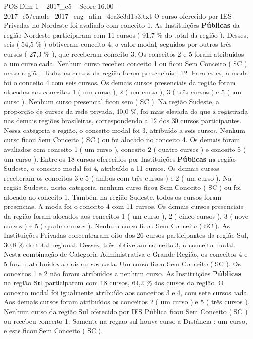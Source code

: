 \begin{textsample}{POS Dim 1 – 2017\_c5 – Score 16.00 – 2017\_c5/enade\_2017\_eng\_alim\_4ea3c3d1b3.txt}
O curso oferecido por IES Privadas no Nordeste foi avaliado com conceito 1.
As Instituições \textbf{Públicas} da região Nordeste participaram com 11 cursos ( 91,7 \% do total da região ).
Desses, seis ( 54,5 \% ) obtiveram conceito 4, o valor modal, seguidos por outros três cursos ( 27,3 \% ), que receberam conceito 3.
Os conceitos 2 e 5 foram atribuídos a um curso cada.
Nenhum curso recebeu conceito 1 ou ficou Sem Conceito ( SC ) nessa região.
Todos os cursos da região foram presenciais : 12.
Para estes, a moda foi o conceito 4 com seis cursos.
Os demais cursos presenciais da região foram alocados aos conceitos 1 ( um curso ), 2 ( um curso ), 3 ( três cursos ) e 5 ( um curso ).
Nenhum curso presencial ficou sem ( SC ).
Na região Sudeste, a proporção de cursos da rede privada, 40,0 \%, foi mais elevada do que a registrada nas demais regiões brasileiras, correspondendo a 12 dos 30 cursos participantes.
Nessa categoria e região, o conceito modal foi 3, atribuído a seis cursos.
Nenhum curso ficou Sem Conceito ( SC ) ou foi alocado no conceito 4.
Os demais foram avaliados com conceito 1 ( um curso ), conceito 2 ( quatro cursos ) e conceito 5 ( um curso ).
Entre os 18 cursos oferecidos por Instituições \textbf{Públicas} na região Sudeste, o conceito modal foi 4, atribuído a 11 cursos.
Os demais cursos receberam os conceitos 3 e 5 ( ambos com três cursos ) e 2 ( um curso ).
Na região Sudeste, nesta categoria, nenhum curso ficou Sem Conceito ( SC ) ou foi alocado ao conceito 1.
Também na região Sudeste, todos os cursos foram presencias.
A moda foi o conceito 4 com 11 cursos.
Os demais cursos presenciais da região foram alocados aos conceitos 1 ( um curso ), 2 ( cinco cursos ), 3 ( nove cursos ) e 5 ( quatro cursos ).
Nenhum curso ficou Sem Conceito ( SC ).
As Instituições Privadas concentraram oito dos 26 cursos participantes da região Sul, 30,8 \% do total regional.
Desses, três obtiveram conceito 3, o conceito modal.
Nesta combinação de Categoria Administrativa e Grande Região, os conceitos 4 e 5 foram atribuídos a dois cursos cada.
Um curso ficou Sem Conceito ( SC ).
Os conceitos 1 e 2 não foram atribuídos a nenhum curso.
As Instituições \textbf{Públicas} na região Sul participaram com 18 cursos, 69,2 \% dos cursos da região.
O conceito modal foi igualmente atribuído aos conceitos 3 e 4, com sete cursos cada.
Aos demais cursos foram atribuídos os conceitos 2 ( um curso ) e 5 ( três cursos ).
Nenhum curso da região Sul oferecido por IES Pública ficou Sem Conceito ( SC ) ou recebeu conceito 1.
Somente na região sul houve curso a Distância : um curso, e este ficou Sem Conceito ( SC ).

\end{textsample}
